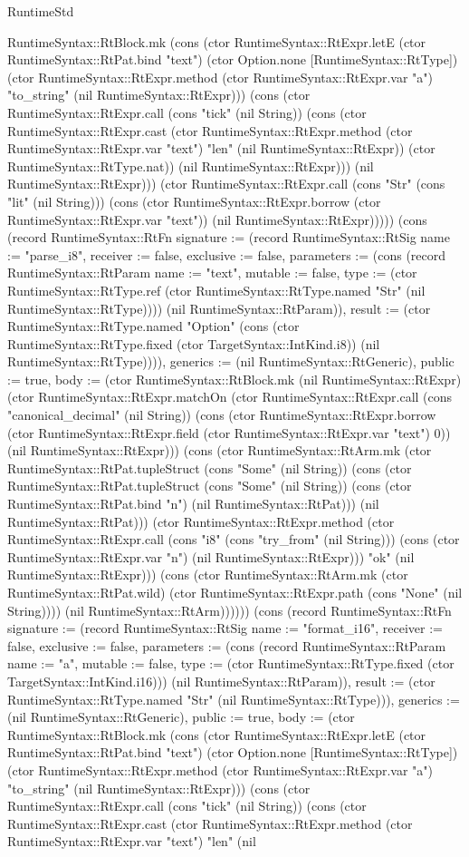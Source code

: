 \begin{lexlean}{RuntimeStd}
\begin{semanticmodule}
{RuntimeSyntax::RtBlock.mk (cons (ctor RuntimeSyntax::RtExpr.letE (ctor RuntimeSyntax::RtPat.bind "text") (ctor Option.none [RuntimeSyntax::RtType]) (ctor RuntimeSyntax::RtExpr.method (ctor RuntimeSyntax::RtExpr.var "a") "to_string" (nil RuntimeSyntax::RtExpr))) (cons (ctor RuntimeSyntax::RtExpr.call (cons "tick" (nil String)) (cons (ctor RuntimeSyntax::RtExpr.cast (ctor RuntimeSyntax::RtExpr.method (ctor RuntimeSyntax::RtExpr.var "text") "len" (nil RuntimeSyntax::RtExpr)) (ctor RuntimeSyntax::RtType.nat)) (nil RuntimeSyntax::RtExpr))) (nil RuntimeSyntax::RtExpr))) (ctor RuntimeSyntax::RtExpr.call (cons "Str" (cons "lit" (nil String))) (cons (ctor RuntimeSyntax::RtExpr.borrow (ctor RuntimeSyntax::RtExpr.var "text")) (nil RuntimeSyntax::RtExpr))))}) (cons (record RuntimeSyntax::RtFn {signature := (record RuntimeSyntax::RtSig {name := "parse_i8", receiver := false, exclusive := false, parameters := (cons (record RuntimeSyntax::RtParam {name := "text", mutable := false, type := (ctor RuntimeSyntax::RtType.ref (ctor RuntimeSyntax::RtType.named "Str" (nil RuntimeSyntax::RtType)))}) (nil RuntimeSyntax::RtParam)), result := (ctor RuntimeSyntax::RtType.named "Option" (cons (ctor RuntimeSyntax::RtType.fixed (ctor TargetSyntax::IntKind.i8)) (nil RuntimeSyntax::RtType)))}), generics := (nil RuntimeSyntax::RtGeneric), public := true, body := (ctor RuntimeSyntax::RtBlock.mk (nil RuntimeSyntax::RtExpr) (ctor RuntimeSyntax::RtExpr.matchOn (ctor RuntimeSyntax::RtExpr.call (cons "canonical_decimal" (nil String)) (cons (ctor RuntimeSyntax::RtExpr.borrow (ctor RuntimeSyntax::RtExpr.field (ctor RuntimeSyntax::RtExpr.var "text") 0)) (nil RuntimeSyntax::RtExpr))) (cons (ctor RuntimeSyntax::RtArm.mk (ctor RuntimeSyntax::RtPat.tupleStruct (cons "Some" (nil String)) (cons (ctor RuntimeSyntax::RtPat.tupleStruct (cons "Some" (nil String)) (cons (ctor RuntimeSyntax::RtPat.bind "n") (nil RuntimeSyntax::RtPat))) (nil RuntimeSyntax::RtPat))) (ctor RuntimeSyntax::RtExpr.method (ctor RuntimeSyntax::RtExpr.call (cons "i8" (cons "try_from" (nil String))) (cons (ctor RuntimeSyntax::RtExpr.var "n") (nil RuntimeSyntax::RtExpr))) "ok" (nil RuntimeSyntax::RtExpr))) (cons (ctor RuntimeSyntax::RtArm.mk (ctor RuntimeSyntax::RtPat.wild) (ctor RuntimeSyntax::RtExpr.path (cons "None" (nil String)))) (nil RuntimeSyntax::RtArm)))))}) (cons (record RuntimeSyntax::RtFn {signature := (record RuntimeSyntax::RtSig {name := "format_i16", receiver := false, exclusive := false, parameters := (cons (record RuntimeSyntax::RtParam {name := "a", mutable := false, type := (ctor RuntimeSyntax::RtType.fixed (ctor TargetSyntax::IntKind.i16))}) (nil RuntimeSyntax::RtParam)), result := (ctor RuntimeSyntax::RtType.named "Str" (nil RuntimeSyntax::RtType))}), generics := (nil RuntimeSyntax::RtGeneric), public := true, body := (ctor RuntimeSyntax::RtBlock.mk (cons (ctor RuntimeSyntax::RtExpr.letE (ctor RuntimeSyntax::RtPat.bind "text") (ctor Option.none [RuntimeSyntax::RtType]) (ctor RuntimeSyntax::RtExpr.method (ctor RuntimeSyntax::RtExpr.var "a") "to_string" (nil RuntimeSyntax::RtExpr))) (cons (ctor RuntimeSyntax::RtExpr.call (cons "tick" (nil String)) (cons (ctor RuntimeSyntax::RtExpr.cast (ctor RuntimeSyntax::RtExpr.method (ctor RuntimeSyntax::RtExpr.var "text") "len" (nil }
\end{semanticmodule}
\end{lexlean}

